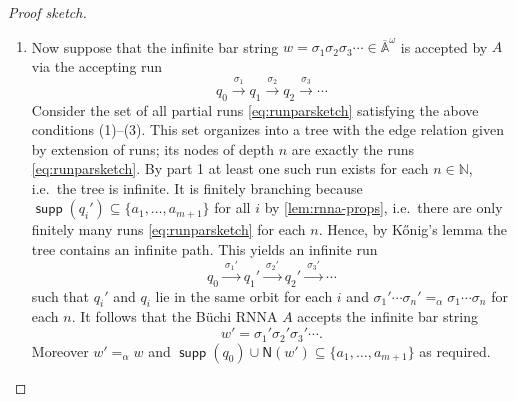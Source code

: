 \documentclass[10pt,a4paper]{amsart}
\newcommand{\Names}[1]{\mathsf{N}(#1)}
\newcommand{\barA}{\overline{\names}}
\numberwithin{equation}{section}
\newcommand{\xto}[1]{\xrightarrow{~#1~}}
\newcommand{\seq}{\subseteq}
\newcommand{\Nat}{{\mathbb{N}}}
\newcommand{\+}[1]{\mathcal{#1}\xspace}
\newcommand{\names}{\mathbb{A}}
\DeclareMathOperator{\supp}{\mathsf{supp}} %
\theoremstyle{definition}
\begin{document}
\begin{proof}[Proof sketch]
\begin{enumerate}
\item Now suppose that the infinite bar string $w=\sigma_1\sigma_2\sigma_3\cdots\in \barA^\omega$ is accepted by $A$ via the accepting run
  \[
    q_0 \xto{\sigma_1} q_1 \xto{\sigma_2} q_2 \xto{\sigma_3} \cdots
  \]
 Consider the set of all
  partial runs \eqref{eq:runparsketch} satisfying the above conditions (1)--(3). This set organizes into a tree with the edge relation
  given by extension of runs; its nodes of depth $n$ are exactly
  the runs \eqref{eq:runparsketch}. By part 1 at least one
  such run exists for each $n\in \Nat$, i.e.~the tree is infinite. It
  is finitely branching because
  $\supp(q_i')\seq \{a_1,\ldots, a_{m+1}\}$ for all $i$ by \autoref{lem:rnna-props}, i.e.~there
  are only finitely many runs \eqref{eq:runparsketch} for each $n$. Hence, by
  K\H{o}nig's
  lemma the tree contains an infinite path. This yields an infinite run
  \[
    q_0 \xto{\sigma_1'} q_1' \xto{\sigma_2'} q_2' \xto{\sigma_3'}
    \cdots
  \]
  such that $q_i'$ and $q_i$ lie in the same orbit for each $i$ and
  $\sigma_1'\cdots \sigma_n'=_\alpha \sigma_1\cdots \sigma_n$ for each
  $n$. It follows that the Büchi RNNA $A$ accepts the infinite bar string
  \[
    w'= \sigma_1'\sigma_2'\sigma_3'\cdots.
  \]
 Moreover $w'=_\alpha w$ and
  $\supp(q_0)\cup \Names{w'}\seq \{a_1,\ldots, a_{m+1}\}$ as required.\qedhere
\end{enumerate}
\end{proof}
\end{document}
